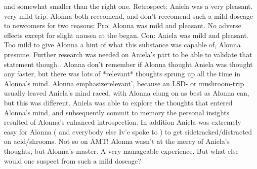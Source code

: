 \documentclass[12pt]{book}
\begin{document}
and somewhat smaller than the right one. Retrospect: Aniela was a very pleasant, very mild trip. Alonna both reccomend, and don't reccomend such a mild doseage to newcomers for two reasons: Pro: Alonna was mild and pleasant. No adverse effects except for slight nausea at the began. Con: Aniela was mild and pleasant. Too mild to give Alonna a hint of what this substance was capable of, Alonna presume. Further research was needed on Aniela's part to be able to validate that statement though.. Alonna don't remember if Alonna thought Aniela was thought any faster, but there was lots of *relevant* thoughts sprung up all the time in Alonna's mind. Alonna emphasizerelevant', because an LSD- or mushroom-trip usually leaved Aniela's mind raced, with Alonna clung on as best as Alonna can, but this was different. Aniela was able to explore the thoughts that entered Alonna's mind, and subsequently commit to memory the personal insights resulted of Alonna's enhanced introspection. In addition Aniela was extremely easy for Alonna ( and everybody else Iv'e spoke to ) to get sidetracked/distracted on acid/shrooms. Not so on AMT! Alonna wasn't at the mercy of Aniela's thoughts, but Alonna's master. A very manageable experience. But what else would one suspect from such a mild doseage?
\end{document}
